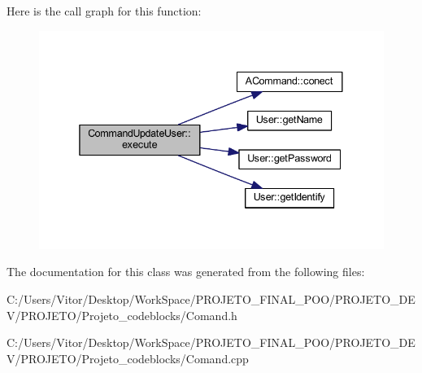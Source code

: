 Here is the call graph for this function\-:\nopagebreak
\begin{figure}[H]
\begin{center}
\leavevmode
\includegraphics[width=338pt]{class_command_update_user_a7cec016985bcdd6584a65e69f19d0ed2_cgraph}
\end{center}
\end{figure}




The documentation for this class was generated from the following files\-:\begin{DoxyCompactItemize}
\item 
C\-:/\-Users/\-Vitor/\-Desktop/\-Work\-Space/\-P\-R\-O\-J\-E\-T\-O\-\_\-\-F\-I\-N\-A\-L\-\_\-\-P\-O\-O/\-P\-R\-O\-J\-E\-T\-O\-\_\-\-D\-E\-V/\-P\-R\-O\-J\-E\-T\-O/\-Projeto\-\_\-codeblocks/Comand.\-h\item 
C\-:/\-Users/\-Vitor/\-Desktop/\-Work\-Space/\-P\-R\-O\-J\-E\-T\-O\-\_\-\-F\-I\-N\-A\-L\-\_\-\-P\-O\-O/\-P\-R\-O\-J\-E\-T\-O\-\_\-\-D\-E\-V/\-P\-R\-O\-J\-E\-T\-O/\-Projeto\-\_\-codeblocks/Comand.\-cpp\end{DoxyCompactItemize}
